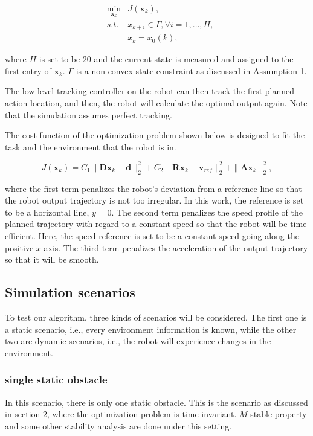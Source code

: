 \documentclass{ifacconf}
\begin{document}
\begin{eqnarray}
&\min_{\mathbf{x}_{k}} & J(\mathbf{x}_k),\\
&s.t.& x_{k+i}\in\Gamma,\forall i=1,\ldots,H,\\
&&         x_{k}=x_0(k),
\end{eqnarray}

where $H$ is set to be 20 and the current state is measured and assigned to the first entry of $\mathbf{x}_{k}$. $\Gamma$ is a non-convex state constraint as discussed in Assumption 1.

The low-level tracking controller on the robot can then track the first planned action location, and then, the robot will calculate the optimal output again. Note that the simulation assumes perfect tracking.

The cost function of the optimization problem shown below is designed to fit the task and the environment that the robot is in.

\begin{equation}
J(\mathbf{x}_k) = C_1\|\mathbf{D}\mathbf{x}_k-\mathbf{d}\|_{2}^2 + C_2 \|\mathbf{R}\mathbf{x}_k-\mathbf{v}_{ref}\|_2^2 +\|\mathbf{A}\mathbf{x}_{k}\|_2^2,  
\end{equation}

where the first term penalizes the robot's deviation from a reference line so that the robot output trajectory is not too irregular. In this work, the reference is set to be a horizontal line, $y=0$. The second term penalizes the speed profile of the planned trajectory with regard to a constant speed so that the robot will be time efficient. Here, the speed reference is set to be a constant speed going along the positive $x$-axis. The third term penalizes the acceleration of the output trajectory so that it will be smooth.  

\subsection{Simulation scenarios}

To test our algorithm, three kinds of scenarios will be considered. The first one is a static scenario, i.e., every environment information is known, while the other two are dynamic scenarios, i.e., the robot will experience changes in the environment.

\subsubsection{single static obstacle}
In this scenario, there is  only one static obstacle. This is the scenario as discussed in section 2, where the optimization problem is time invariant. $M$-stable property and some other stability analysis are done under this setting.
\end{document}
